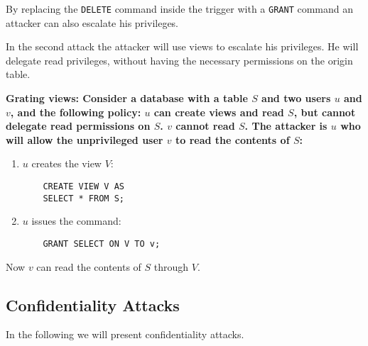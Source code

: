 By replacing the \texttt{DELETE} command inside the trigger with a \texttt{GRANT} command an attacker can also escalate his privileges.

In the second attack the attacker will use views to escalate his privileges. He will delegate read privileges, without having the necessary permissions on the origin table.

\begin{attack}
\bf{Grating views:}
Consider a database with a table $S$ and two users $u$ and $v$, and the following policy: $u$ can create views and read $S$, but cannot delegate read permissions on $S$. $v$ cannot read $S$. The attacker is $u$ who will allow the unprivileged user $v$ to read the contents of $S$:
\begin{enumerate}
\item $u$ creates the view $V$:
	\begin{verbatim}
	CREATE VIEW V AS
	SELECT * FROM S;
	\end{verbatim}
\item $u$ issues the command:
	\begin{verbatim}
	GRANT SELECT ON V TO v;
	\end{verbatim}
\end{enumerate}
Now $v$ can read the contents of $S$ through $V$.
\end{attack}

\subsection{Confidentiality Attacks}

In the following we will present confidentiality attacks.



